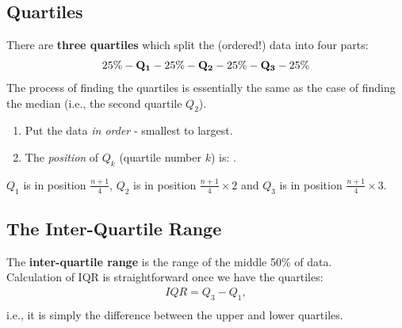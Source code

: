 \subsection{Quartiles}
\begin{frame}{\bf {}}

There are {\bf three quartiles} which split the (ordered!) data into four parts:\\[-0.4cm]
\begin{align*}
25\% - {\bf Q_1} - 25\% - {\bf Q_2} - 25\% - {\bf Q_3} - 25\%
\end{align*}
The process of finding the quartiles is essentially the same as the case of finding the median (i.e., the second quartile $Q_2$).\\[0.4cm]
\begin{enumerate}[1.]
\item Put the data \emph{in order} - smallest to largest.
\item The \emph{position} of $Q_k$ (quartile number $k$) is:
    .\\[0.6cm]
\end{enumerate}

$Q_1$ is in position $\tfrac{n+1}{4}$, $Q_2$ is in position $\tfrac{n+1}{4}\times2$ and $Q_3$ is in position $\tfrac{n+1}{4}\times3$.

\end{frame}


\subsection{The Inter-Quartile Range}
\begin{frame}{\bf {}}

The {\bf inter-quartile range} is the range of the middle 50\% of data.\\[1.2cm]

Calculation of IQR is straightforward once we have the quartiles:
\begin{align*}
\boxed{IQR = Q_3 - Q_1},\\[-0.1cm]
\end{align*}
i.e., it is simply the difference between the upper and lower quartiles.

\end{frame}




